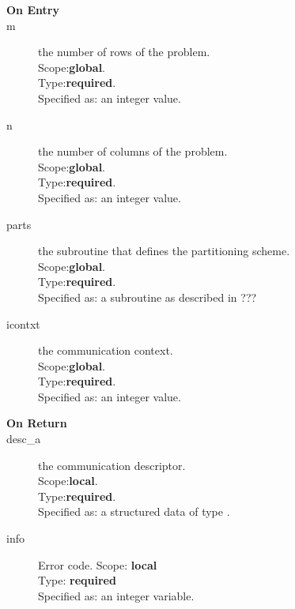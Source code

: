 %
%


\begin{description}
\item[\bf On Entry]
\item[m] the number of rows of the problem.\\
Scope:{\bf global}.\\
Type:{\bf required}.\\
Specified as: an integer value.
\item[n] the number of columns of the problem.\\
Scope:{\bf global}.\\
Type:{\bf required}.\\
Specified as: an integer value.
\item[parts] the subroutine that defines the partitioning scheme.\\
Scope:{\bf global}.\\
Type:{\bf required}.\\
Specified as: a subroutine as described in ???
\item[icontxt] the communication context.\\
Scope:{\bf global}.\\
Type:{\bf required}.\\
Specified as: an integer value.
\end{description}

\begin{description}
\item[\bf On Return]
\item[desc\_a] the communication descriptor.\\
Scope:{\bf local}.\\
Type:{\bf required}.\\
Specified as: a structured data of type \descdata.
\item[info] Error code.
Scope: {\bf local} \\
Type: {\bf required}\\
Specified as: an integer variable.\\
\end{description}


%
%

